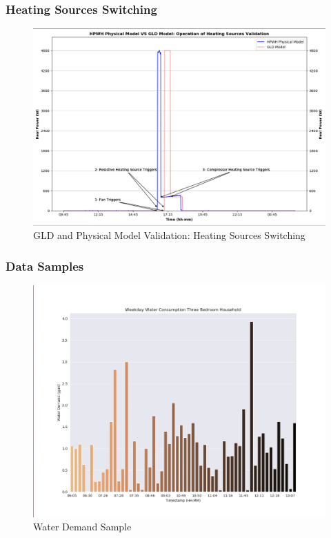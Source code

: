 \newpage
\subsubsection{Heating Sources Switching}
\begin{figure}[H]
    \centering
    \includegraphics[width=1.1\columnwidth]{Pictures/heating_element_switching.png}
    \caption{GLD and Physical Model Validation: Heating Sources Switching}
\end{figure}
\newpage
\subsubsection{Data Samples}
\begin{figure}[H]
    \centering
    \includegraphics[width=1.1\columnwidth]{Pictures/water_demand_sample.png}
    \caption{Water Demand Sample}
\end{figure}

